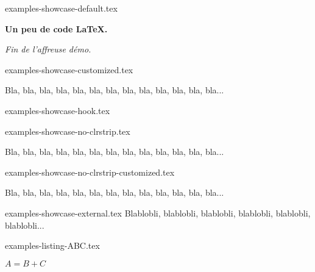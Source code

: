 
\begin{filecontents*}{examples-showcase-default.tex}
\begin{bdocshowcase}
    \bfseries Un peu de code \LaTeX.

    \bigskip

    \emph{\large Fin de l'affreuse démo.}
\end{bdocshowcase}
\end{filecontents*}


\begin{filecontents*}{examples-showcase-customized.tex}
\begin{bdocshowcase}[before = Mon début,
                     after  = Ma fin à moi,
                     color  = red]
    Bla, bla, bla, bla, bla, bla, bla, bla, bla, bla, bla, bla, bla...
\end{bdocshowcase}
\end{filecontents*}


\begin{filecontents*}{examples-showcase-hook.tex}
\begin{bdocshowcase}
\end{bdocshowcase}
\end{filecontents*}


\begin{filecontents*}{examples-showcase-no-clrstrip.tex}
\begin{bdocshowcase}[nostripe]
    Bla, bla, bla, bla, bla, bla, bla, bla, bla, bla, bla, bla, bla...
\end{bdocshowcase}
\end{filecontents*}


\begin{filecontents*}{examples-showcase-no-clrstrip-customized.tex}
\begin{bdocshowcase}[nostripe,
                     before = Mon début,
                     after  = Ma fin à moi,
                     color  = green]
    Bla, bla, bla, bla, bla, bla, bla, bla, bla, bla, bla, bla, bla...
\end{bdocshowcase}
\end{filecontents*}


\begin{filecontents*}{examples-showcase-external.tex}
Blablobli, blablobli, blablobli, blablobli, blablobli, blablobli...
\end{filecontents*}


\begin{filecontents*}{examples-listing-ABC.tex}
\begin{bdoclatex}[sbs]
    $A = B + C$
\end{bdoclatex}
\end{filecontents*}


